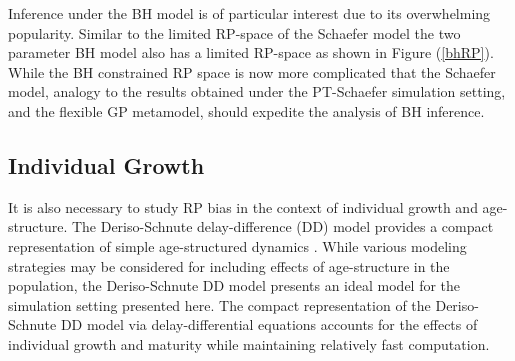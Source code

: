 \documentclass[12pt]{article}
\begin{document}
Inference under the BH model is of particular interest due to its overwhelming 
popularity. Similar to the limited RP-space of the Schaefer model the two 
parameter BH model also has a limited RP-space as shown in Figure (\ref{bhRP}).
While the BH constrained RP space is now more complicated that the Schaefer model, 
analogy to the results obtained under the PT-Schaefer simulation setting, and the 
flexible GP metamodel, should expedite the analysis of BH inference.

\subsection*{Individual Growth}

It is also necessary to study RP bias in the context of
individual growth and age-structure. %
The Deriso-Schnute delay-difference (DD) model provides a compact 
representation of simple age-structured dynamics . %
While various modeling strategies may be considered for including effects of 
age-structure in the population, the Deriso-Schnute DD model presents an ideal 
model for the simulation setting presented here. The compact representation of 
the Deriso-Schnute DD model via delay-differential equations accounts for the 
effects of individual growth and maturity while maintaining relatively fast 
computation.  %
\end{document}
